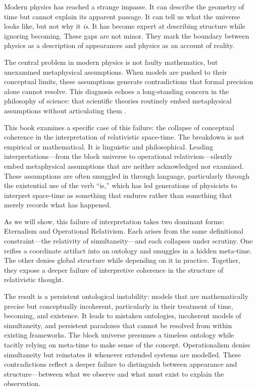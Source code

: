\documentclass[12pt]{book}
\begin{document}
Modern physics has reached a strange impasse. It can describe the geometry of time but cannot explain its apparent passage. It can tell us what the universe looks like, but not why it \textit{is}. It has become expert at describing structure while ignoring becoming. These gaps are not minor. They mark the boundary between physics as a description of appearances and physics as an account of reality.

The central problem in modern physics is not faulty mathematics, but unexamined metaphysical assumptions. When models are pushed to their conceptual limits, these assumptions generate contradictions that formal precision alone cannot resolve. This diagnosis echoes a long-standing concern in the philosophy of science: that scientific theories routinely embed metaphysical assumptions without articulating them \citep{vanFraassen1980, French2020}.

This book examines a specific case of this failure: the collapse of conceptual coherence in the interpretation of relativistic space-time. The breakdown is not empirical or mathematical. It is linguistic and philosophical. Leading interpretations---from the block universe to operational relativism---silently embed metaphysical assumptions that are neither acknowledged nor examined. These assumptions are often smuggled in through language, particularly through the existential use of the verb ``is,'' which has led generations of physicists to interpret space-time as something that endures rather than something that merely records what has happened.

As we will show, this failure of interpretation takes two dominant forms: Eternalism and Operational Relativism. Each arises from the same definitional constraint---the relativity of simultaneity---and each collapses under scrutiny. One reifies a coordinate artifact into an ontology and smuggles in a hidden meta-time. The other denies global structure while depending on it in practice. Together, they expose a deeper failure of interpretive coherence in the structure of relativistic thought.

The result is a persistent ontological instability: models that are mathematically precise but conceptually incoherent, particularly in their treatment of time, becoming, and existence. It leads to mistaken ontologies, incoherent models of simultaneity, and persistent paradoxes that cannot be resolved from within existing frameworks. The block universe presumes a timeless ontology while tacitly relying on meta-time to make sense of the concept. Operationalism denies simultaneity but reinstates it whenever extended systems are modelled. These contradictions reflect a deeper failure to distinguish between appearance and structure---between what we observe and what must exist to explain the observation.
\end{document}
